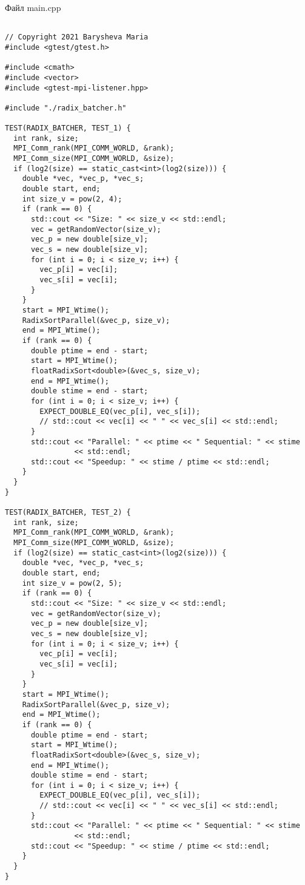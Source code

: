 \documentclass{report}
\begin{document}
Файл main.cpp
\begin{lstlisting}

// Copyright 2021 Barysheva Maria
#include <gtest/gtest.h>

#include <cmath>
#include <vector>
#include <gtest-mpi-listener.hpp>

#include "./radix_batcher.h"

TEST(RADIX_BATCHER, TEST_1) {
  int rank, size;
  MPI_Comm_rank(MPI_COMM_WORLD, &rank);
  MPI_Comm_size(MPI_COMM_WORLD, &size);
  if (log2(size) == static_cast<int>(log2(size))) {
    double *vec, *vec_p, *vec_s;
    double start, end;
    int size_v = pow(2, 4);
    if (rank == 0) {
      std::cout << "Size: " << size_v << std::endl;
      vec = getRandomVector(size_v);
      vec_p = new double[size_v];
      vec_s = new double[size_v];
      for (int i = 0; i < size_v; i++) {
        vec_p[i] = vec[i];
        vec_s[i] = vec[i];
      }
    }
    start = MPI_Wtime();
    RadixSortParallel(&vec_p, size_v);
    end = MPI_Wtime();
    if (rank == 0) {
      double ptime = end - start;
      start = MPI_Wtime();
      floatRadixSort<double>(&vec_s, size_v);
      end = MPI_Wtime();
      double stime = end - start;
      for (int i = 0; i < size_v; i++) {
        EXPECT_DOUBLE_EQ(vec_p[i], vec_s[i]);
        // std::cout << vec[i] << " " << vec_s[i] << std::endl;
      }
      std::cout << "Parallel: " << ptime << " Sequential: " << stime
                << std::endl;
      std::cout << "Speedup: " << stime / ptime << std::endl;
    }
  }
}

TEST(RADIX_BATCHER, TEST_2) {
  int rank, size;
  MPI_Comm_rank(MPI_COMM_WORLD, &rank);
  MPI_Comm_size(MPI_COMM_WORLD, &size);
  if (log2(size) == static_cast<int>(log2(size))) {
    double *vec, *vec_p, *vec_s;
    double start, end;
    int size_v = pow(2, 5);
    if (rank == 0) {
      std::cout << "Size: " << size_v << std::endl;
      vec = getRandomVector(size_v);
      vec_p = new double[size_v];
      vec_s = new double[size_v];
      for (int i = 0; i < size_v; i++) {
        vec_p[i] = vec[i];
        vec_s[i] = vec[i];
      }
    }
    start = MPI_Wtime();
    RadixSortParallel(&vec_p, size_v);
    end = MPI_Wtime();
    if (rank == 0) {
      double ptime = end - start;
      start = MPI_Wtime();
      floatRadixSort<double>(&vec_s, size_v);
      end = MPI_Wtime();
      double stime = end - start;
      for (int i = 0; i < size_v; i++) {
        EXPECT_DOUBLE_EQ(vec_p[i], vec_s[i]);
        // std::cout << vec[i] << " " << vec_s[i] << std::endl;
      }
      std::cout << "Parallel: " << ptime << " Sequential: " << stime
                << std::endl;
      std::cout << "Speedup: " << stime / ptime << std::endl;
    }
  }
}


\end{lstlisting}
\end{document}
